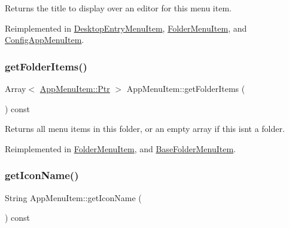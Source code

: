 \begin{DoxyReturn}{Returns}
the title to display over an editor for this menu item. 
\end{DoxyReturn}


Reimplemented in \mbox{\hyperlink{classDesktopEntryMenuItem_a0b57ee9d99e2ddf037ba8fe91c725bab}{Desktop\+Entry\+Menu\+Item}}, \mbox{\hyperlink{classFolderMenuItem_a0cd063b5b374a47a0913ff11c4c1a905}{Folder\+Menu\+Item}}, and \mbox{\hyperlink{classConfigAppMenuItem_a4982d39204f8e5449917a934866fd0f3}{Config\+App\+Menu\+Item}}.

\mbox{\label{classAppMenuItem_a3a9b2ec87af0c063a892753bd64e944a}} 
\subsubsection{\texorpdfstring{get\+Folder\+Items()}{getFolderItems()}}
{\footnotesize\ttfamily Array$<$ \mbox{\hyperlink{classAppMenuItem_ab5f51c5d74f8df62b8862c0cc8126cb7}{App\+Menu\+Item\+::\+Ptr}} $>$ App\+Menu\+Item\+::get\+Folder\+Items (\begin{DoxyParamCaption}{ }\end{DoxyParamCaption}) const\hspace{0.3cm}{\ttfamily [virtual]}}

\begin{DoxyReturn}{Returns}
all menu items in this folder, or an empty array if this isn\textquotesingle{}t a folder. 
\end{DoxyReturn}


Reimplemented in \mbox{\hyperlink{classFolderMenuItem_af3b9473a335da9e3cb6ceccbb78c3ea6}{Folder\+Menu\+Item}}, and \mbox{\hyperlink{classBaseFolderMenuItem_aeb33a4ceb17469daa82de80a44a2e862}{Base\+Folder\+Menu\+Item}}.

\mbox{\label{classAppMenuItem_a7c5b3d84b4fa24009e0618e0e3cd804e}} 
\subsubsection{\texorpdfstring{get\+Icon\+Name()}{getIconName()}}
{\footnotesize\ttfamily String App\+Menu\+Item\+::get\+Icon\+Name (\begin{DoxyParamCaption}{ }\end{DoxyParamCaption}) const\hspace{0.3cm}{\ttfamily [virtual]}}

